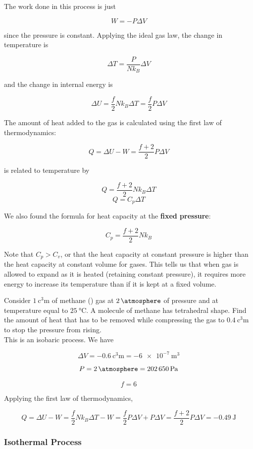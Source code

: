 The work done in this process is just

$$W=-P\Delta V$$

since the pressure is constant. Applying the ideal gas law, the change in temperature is

$$\Delta T = \frac{P}{Nk_B}\Delta V$$

and the change in internal energy is

$$\Delta U = \frac{f}{2}Nk_B\Delta T=\frac{f}{2}P\Delta V$$

The amount of heat added to the gas is calculated using the first law of thermodynamics:

$$Q=\Delta U-W=\frac{f+2}{2} P\Delta V$$

is related to temperature by

$$Q=\frac{f+2}{2} Nk_B\Delta T$$
$$Q=C_p\Delta T$$

We also found the formula for heat capacity at the \textbf{fixed pressure}:

$$C_p=\frac{f+2}{2} Nk_B$$

Note that $C_p > C_v$, or that the heat capacity at constant pressure is higher than the heat capacity at constant volume for gases. This tells us that when gas is allowed to expand as it is heated (retaining constant pressure), it requires more energy to increase its temperature than if it is kept at a fixed volume.

\begin{texample}
	Consider $\SI{1}{\cubic\centi\meter}$ of methane () gas at $\SI{2}{\atmosphere}$ of pressure and at temperature equal to $\SI{25}{\celsius}$. A molecule of methane has tetrahedral shape. Find the amount of heat that has to be removed while compressing the gas to $\SI{0.4}{\cubic\centi\meter}$ to stop the pressure from rising. \\
	
	This is an isobaric process. We have
	
	$$\Delta V=\SI{-0.6}{\cubic\centi\meter}=\SI{-6e-7}{\cubic\meter}$$
	
	$$P=\SI{2}{\atmosphere}=\SI{202650}{\pascal}$$
	
	$$f=6$$
	
	Applying the first law of thermodynamics,
	
	$$Q=\Delta U - W=\frac{f}{2}Nk_B\Delta T - W=\frac{f}{2}P\Delta V+P\Delta V=\frac{f+2}{2}P\Delta V=\SI{-0.49}{\joule}$$
\end{texample}

\subsubsection{Isothermal Process}

